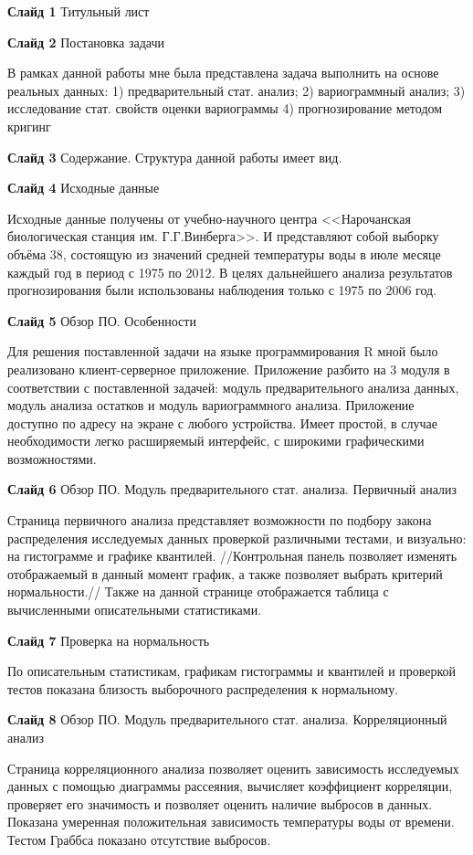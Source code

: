 \documentclass[a4paper,10pt]{report}
\begin{document}
\textbf{Слайд 1} Титульный лист

\textbf{Слайд 2} Постановка задачи

В рамках данной работы мне была представлена задача выполнить на основе реальных данных: 1) предварительный стат. анализ; 2) вариограммный анализ; 3) исследование стат. свойств оценки вариограммы 4) прогнозирование методом кригинг

\textbf{Слайд 3} Содержание. Структура данной работы имеет вид.

\textbf{Слайд 4} Исходные данные

Исходные данные получены от учебно-научного центра <<Нарочанская биологическая станция им. Г.Г.Винберга>>. И представляют собой выборку объёма 38, состоящую из значений средней температуры воды в июле месяце каждый год в период с 1975 по 2012. В целях дальнейшего анализа результатов прогнозирования были использованы наблюдения только с 1975 по 2006 год.

\textbf{Слайд 5} Обзор ПО. Особенности

Для решения поставленной задачи на языке программирования R мной было реализовано клиент-серверное приложение. Приложение разбито на 3 модуля в соответствии с поставленной задачей: модуль предварительного анализа данных, модуль анализа остатков и модуль вариограммного анализа. Приложение доступно по адресу на экране с любого устройства. Имеет простой, в случае необходимости легко расширяемый интерфейс, с широкими графическими возможностями.

\textbf{Слайд 6} Обзор ПО. Модуль предварительного стат. анализа. Первичный анализ

Страница первичного анализа представляет возможности по подбору закона распределения исследуемых данных проверкой различными тестами, и визуально: на гистограмме и графике квантилей. //Контрольная панель позволяет изменять отображаемый в данный момент график, а также позволяет выбрать критерий нормальности.// Также на данной странице отображается таблица с вычисленными описательными статистиками.

\textbf{Слайд 7} Проверка на нормальность

По описательным статистикам, графикам гистограммы и квантилей и проверкой тестов показана близость выборочного распределения к нормальному.

\textbf{Слайд 8} Обзор ПО. Модуль предварительного стат. анализа. Корреляционный анализ

Страница корреляционного анализа позволяет оценить зависимость исследуемых данных с помощью диаграммы рассеяния, вычисляет коэффициент корреляции, проверяет его значимость и позволяет оценить наличие выбросов в данных. Показана умеренная положительная зависимость температуры воды от времени. Тестом Граббса показано отсутствие выбросов.
\end{document}
